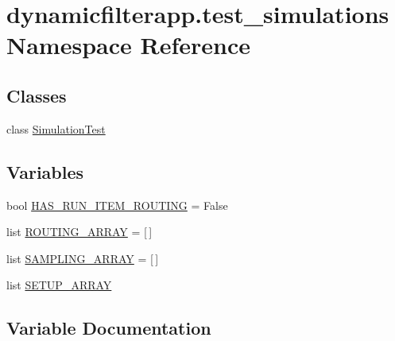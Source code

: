 \hypertarget{namespacedynamicfilterapp_1_1test__simulations}{}\section{dynamicfilterapp.\+test\+\_\+simulations Namespace Reference}
\label{namespacedynamicfilterapp_1_1test__simulations}
\subsection*{Classes}
\begin{DoxyCompactItemize}
\item 
class \hyperlink{classdynamicfilterapp_1_1test__simulations_1_1_simulation_test}{Simulation\+Test}
\end{DoxyCompactItemize}
\subsection*{Variables}
\begin{DoxyCompactItemize}
\item 
bool \hyperlink{namespacedynamicfilterapp_1_1test__simulations_a0ed90967f9651d5b20bd15ad5238c5a2}{H\+A\+S\+\_\+\+R\+U\+N\+\_\+\+I\+T\+E\+M\+\_\+\+R\+O\+U\+T\+I\+NG} = False
\item 
list \hyperlink{namespacedynamicfilterapp_1_1test__simulations_a64e6195c8f341cc04542e1008988d1fd}{R\+O\+U\+T\+I\+N\+G\+\_\+\+A\+R\+R\+AY} = \mbox{[}$\,$\mbox{]}
\item 
list \hyperlink{namespacedynamicfilterapp_1_1test__simulations_af59ca891e478dcc8a04e8f4caf690e8c}{S\+A\+M\+P\+L\+I\+N\+G\+\_\+\+A\+R\+R\+AY} = \mbox{[}$\,$\mbox{]}
\item 
list \hyperlink{namespacedynamicfilterapp_1_1test__simulations_aa4c6622e6cd276664a1a67c43db0673f}{S\+E\+T\+U\+P\+\_\+\+A\+R\+R\+AY}
\end{DoxyCompactItemize}


\subsection{Variable Documentation}
\mbox{\label{namespacedynamicfilterapp_1_1test__simulations_a0ed90967f9651d5b20bd15ad5238c5a2}} 
